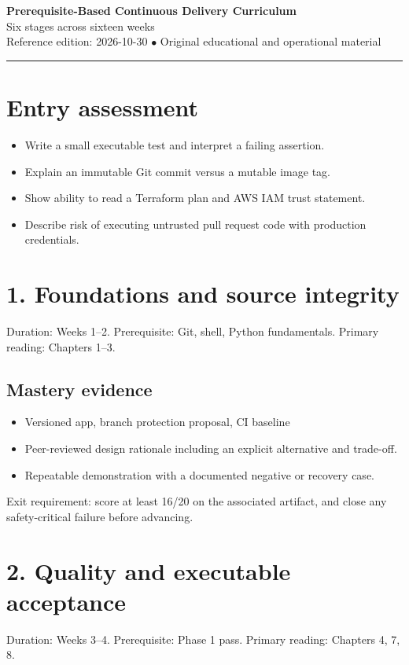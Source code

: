 \documentclass[10pt,letterpaper]{article}
\begin{document}
\begin{center}
{\LARGE\bfseries\color{cdblue}Prerequisite-Based Continuous Delivery Curriculum}\\[7pt]
{\large Six stages across sixteen weeks}\\[6pt]
{\small Reference edition: 2026-10-30 $\bullet$ Original educational and operational material}
\end{center}
\noindent\color{cdblue}\rule{\linewidth}{1.2pt}\color{black}
\vspace{0.4em}
\section{Entry assessment}
\begin{itemize}
\item Write a small executable test and interpret a failing assertion.
\item Explain an immutable Git commit versus a mutable image tag.
\item Show ability to read a Terraform plan and AWS IAM trust statement.
\item Describe risk of executing untrusted pull request code with production credentials.
\end{itemize}

\section{1. Foundations and source integrity}
Duration: Weeks 1--2. Prerequisite: Git, shell, Python fundamentals. Primary reading: Chapters 1--3.

\subsection{Mastery evidence}
\begin{itemize}
\item Versioned app, branch protection proposal, CI baseline
\item Peer-reviewed design rationale including an explicit alternative and trade-off.
\item Repeatable demonstration with a documented negative or recovery case.
\end{itemize}

Exit requirement: score at least 16/20 on the associated artifact, and close any safety-critical failure before advancing.


\section{2. Quality and executable acceptance}
Duration: Weeks 3--4. Prerequisite: Phase 1 pass. Primary reading: Chapters 4, 7, 8.
\end{document}
